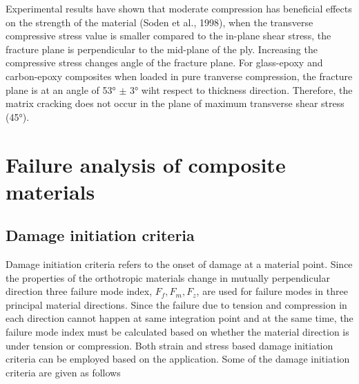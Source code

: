 \documentclass[a4paper,14pt]{extarticle}
\begin{document}
 Experimental results have shown that moderate compression has beneficial effects on the strength of the material (Soden et al., 1998), when the transverse compressive stress value is smaller compared to the in-plane shear stress, the fracture plane is perpendicular to the mid-plane of the ply. Increasing the compressive stress changes angle of the fracture plane. For glass-epoxy and carbon-epoxy composites when loaded in pure tranverse compression, the fracture plane is at an angle of 53° $\pm$ 3° wiht respect to thickness direction. Therefore, the matrix cracking does not occur in the plane of maximum transverse shear stress (45°).


\newpage
\section{Failure analysis of composite materials}
\subsection{Damage initiation criteria}
\indent\indent\indent  Damage initiation criteria refers to the onset of damage at a material point. Since the properties of the orthotropic materials change in mutually perpendicular direction three failure mode index, $F_{f}, F_{m}, F_{z}$, are used for failure modes in three principal material directions. Since the failure due to tension and compression in each direction cannot happen at same integration point and at the same time, the failure mode index must be calculated based on whether the material direction is under tension or compression. Both strain and stress based damage initiation criteria can be employed based on the application. Some of the damage initiation criteria are given as follows
\end{document}
